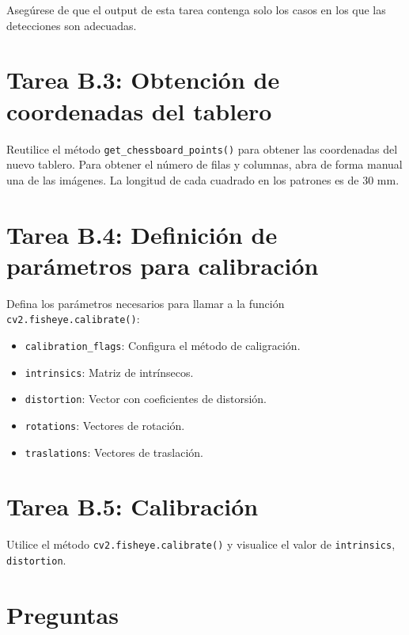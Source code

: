 Asegúrese de que el output de esta tarea contenga solo los casos en los que las detecciones son adecuadas.

\section*{Tarea B.3: Obtención de coordenadas del tablero}
Reutilice el método \texttt{get\_chessboard\_points()} para obtener las coordenadas del nuevo tablero. Para obtener el número de filas y columnas, abra de forma manual una de las imágenes. La longitud de cada cuadrado en los patrones es de 30 mm.

\section*{Tarea B.4: Definición de parámetros para calibración}

Defina los parámetros necesarios para llamar a la función \texttt{cv2.fisheye.calibrate()}:

\begin{itemize}
    \item \texttt{calibration\_flags}: Configura el método de caligración.
    \item \texttt{intrinsics}: Matriz de intrínsecos.
    \item \texttt{distortion}: Vector con coeficientes de distorsión.
    \item \texttt{rotations}: Vectores de rotación.
    \item \texttt{traslations}: Vectores de traslación.
\end{itemize}


\section*{Tarea B.5: Calibración}

Utilice el método \texttt{cv2.fisheye.calibrate()} y visualice el valor de \texttt{intrinsics}, \texttt{distortion}.

\newpage
\section*{Preguntas}

